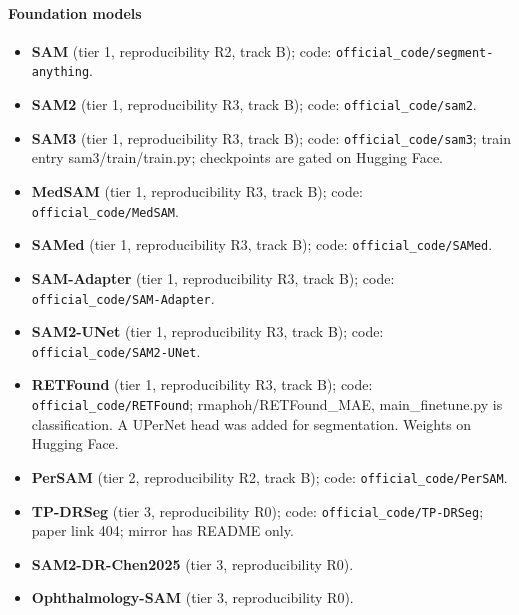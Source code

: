 \paragraph{Foundation models}
\begin{itemize}[leftmargin=*,itemsep=1pt]
\item \textbf{SAM} (tier 1, reproducibility R2, track B); code: \texttt{official\_code/segment-anything}.
\item \textbf{SAM2} (tier 1, reproducibility R3, track B); code: \texttt{official\_code/sam2}.
\item \textbf{SAM3} (tier 1, reproducibility R3, track B); code: \texttt{official\_code/sam3}; train entry sam3/train/train.py; checkpoints are gated on Hugging Face.
\item \textbf{MedSAM} (tier 1, reproducibility R3, track B); code: \texttt{official\_code/MedSAM}.
\item \textbf{SAMed} (tier 1, reproducibility R3, track B); code: \texttt{official\_code/SAMed}.
\item \textbf{SAM-Adapter} (tier 1, reproducibility R3, track B); code: \texttt{official\_code/SAM-Adapter}.
\item \textbf{SAM2-UNet} (tier 1, reproducibility R3, track B); code: \texttt{official\_code/SAM2-UNet}.
\item \textbf{RETFound} (tier 1, reproducibility R3, track B); code: \texttt{official\_code/RETFound}; rmaphoh/RETFound\_MAE, main\_finetune.py is classification. A UPerNet head was added for segmentation. Weights on Hugging Face.
\item \textbf{PerSAM} (tier 2, reproducibility R2, track B); code: \texttt{official\_code/PerSAM}.
\item \textbf{TP-DRSeg} (tier 3, reproducibility R0); code: \texttt{official\_code/TP-DRSeg}; paper link 404; mirror has README only.
\item \textbf{SAM2-DR-Chen2025} (tier 3, reproducibility R0).
\item \textbf{Ophthalmology-SAM} (tier 3, reproducibility R0).
\end{itemize}
